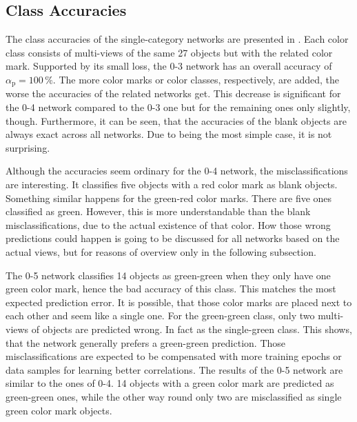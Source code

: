 \subsection{Class Accuracies}
\label{sec:predictions-accuracies}
The class accuracies of the single-category networks are presented in .
Each color class consists of multi-views of the same 27 objects but with the related color mark.
Supported by its small loss, the 0-3 network has an overall accuracy of $\alpha_{\text{p}}=100\,\%$.
The more color marks or color classes, respectively, are added, the worse the accuracies of the related networks get.
This decrease is significant for the 0-4 network compared to the 0-3 one but for the remaining ones only slightly, though.
Furthermore, it can be seen, that the accuracies of the blank objects are always exact across all networks.
Due to being the most simple case, it is not surprising.

Although the accuracies seem ordinary for the 0-4 network, the misclassifications are interesting.
It classifies five objects with a red color mark as blank objects.
Something similar happens for the green-red color marks.
There are five ones classified as green.
However, this is more understandable than the blank misclassifications, due to the actual existence of that color.
How those wrong predictions could happen is going to be discussed for all networks based on the actual views, but for reasons of overview only in the following subsection.

The 0-5 network classifies 14 objects as green-green when they only have one green color mark, hence the bad accuracy of this class.
This matches the most expected prediction error.
It is possible, that those color marks are placed next to each other and seem like a single one.
For the green-green class, only two multi-views of objects are predicted wrong.
In fact as the single-green class.
This shows, that the network generally prefers a green-green prediction.
Those misclassifications are expected to be compensated with more training epochs or data samples for learning better correlations.
The results of the 0-5 network are similar to the ones of 0-4.
14 objects with a green color mark are predicted as green-green ones, while the other way round only two are misclassified as single green color mark objects.

